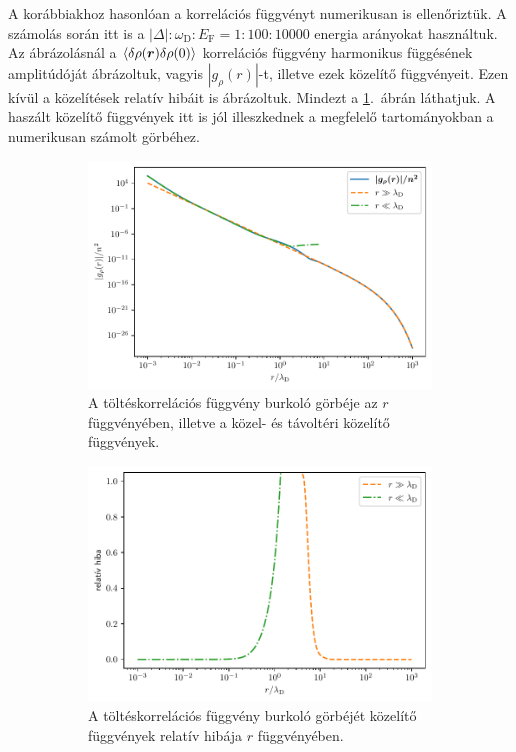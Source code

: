 \documentclass[a4paper,12pt,titlepage]{article}
\newcommand{\RR}{{\vb*{r}}}
\newcommand{\EF}{{E_\text{F}}}
\begin{document}
A korábbiakhoz hasonlóan a korrelációs függvényt numerikusan is ellenőriztük.  A számolás során itt is a $\left| \Delta \right| : \omega_\text{D} : \EF = 1 : 100 : 10000$ energia arányokat használtuk.  Az ábrázolásnál a $\expval{\delta\rho(\RR) \delta\rho(0)}$ korrelációs függvény harmonikus függésének amplitúdóját ábrázoltuk, vagyis $\left| g_\rho(r) \right|$-t, illetve ezek közelítő függvényeit.  Ezen kívül a közelítések relatív hibáit is ábrázoltuk.  Mindezt a \ref{rho-fig}.\ ábrán láthatjuk.  A haszált közelítő függvények itt is jól illeszkednek a megfelelő tartományokban a numerikusan számolt görbéhez.

\begin{figure}[h!]
	\centering
	\begin{subfigure}[t]{0.48\linewidth}
		\centering
		\includegraphics[width=\linewidth]{rho.pdf}
		\caption{\centering A töltéskorrelációs függvény burkoló görbéje az $r$ függvényében, illetve a közel- \newline és távoltéri közelítő függvények.}
	\end{subfigure}%
	\begin{subfigure}[t]{0.48\linewidth}
		\centering
		\includegraphics[width=0.96\linewidth]{rho_error.pdf}
		\caption{\centering A töltéskorrelációs függvény burkoló görbéjét közelítő függvények relatív hibája \newline $r$ függvényében.}
	\end{subfigure}
	\caption{}
	\label{rho-fig}
\end{figure}
\end{document}
